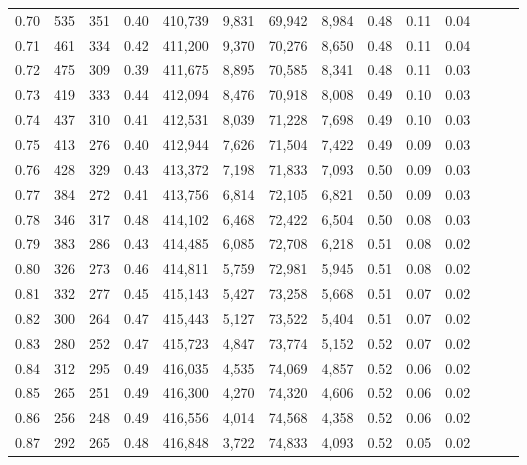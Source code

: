 \begin{tabular}{rrrrrrrrrrrrrr}
0.70 &     535 &    351 &  0.40 &  410,739 &    9,831 &  69,942 &   8,984 &  0.48 &  0.11 &      0.04 \\
0.71 &     461 &    334 &  0.42 &  411,200 &    9,370 &  70,276 &   8,650 &  0.48 &  0.11 &      0.04 \\
0.72 &     475 &    309 &  0.39 &  411,675 &    8,895 &  70,585 &   8,341 &  0.48 &  0.11 &      0.03 \\
0.73 &     419 &    333 &  0.44 &  412,094 &    8,476 &  70,918 &   8,008 &  0.49 &  0.10 &      0.03 \\
0.74 &     437 &    310 &  0.41 &  412,531 &    8,039 &  71,228 &   7,698 &  0.49 &  0.10 &      0.03 \\
0.75 &     413 &    276 &  0.40 &  412,944 &    7,626 &  71,504 &   7,422 &  0.49 &  0.09 &      0.03 \\
0.76 &     428 &    329 &  0.43 &  413,372 &    7,198 &  71,833 &   7,093 &  0.50 &  0.09 &      0.03 \\
0.77 &     384 &    272 &  0.41 &  413,756 &    6,814 &  72,105 &   6,821 &  0.50 &  0.09 &      0.03 \\
0.78 &     346 &    317 &  0.48 &  414,102 &    6,468 &  72,422 &   6,504 &  0.50 &  0.08 &      0.03 \\
0.79 &     383 &    286 &  0.43 &  414,485 &    6,085 &  72,708 &   6,218 &  0.51 &  0.08 &      0.02 \\
0.80 &     326 &    273 &  0.46 &  414,811 &    5,759 &  72,981 &   5,945 &  0.51 &  0.08 &      0.02 \\
0.81 &     332 &    277 &  0.45 &  415,143 &    5,427 &  73,258 &   5,668 &  0.51 &  0.07 &      0.02 \\
0.82 &     300 &    264 &  0.47 &  415,443 &    5,127 &  73,522 &   5,404 &  0.51 &  0.07 &      0.02 \\
0.83 &     280 &    252 &  0.47 &  415,723 &    4,847 &  73,774 &   5,152 &  0.52 &  0.07 &      0.02 \\
0.84 &     312 &    295 &  0.49 &  416,035 &    4,535 &  74,069 &   4,857 &  0.52 &  0.06 &      0.02 \\
0.85 &     265 &    251 &  0.49 &  416,300 &    4,270 &  74,320 &   4,606 &  0.52 &  0.06 &      0.02 \\
0.86 &     256 &    248 &  0.49 &  416,556 &    4,014 &  74,568 &   4,358 &  0.52 &  0.06 &      0.02 \\
0.87 &     292 &    265 &  0.48 &  416,848 &    3,722 &  74,833 &   4,093 &  0.52 &  0.05 &      0.02 \\

\end{tabular}
